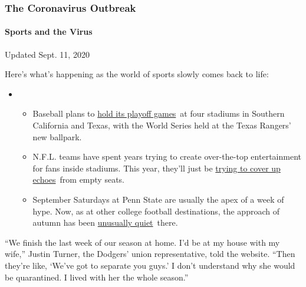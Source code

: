\hypertarget{the-coronavirus-outbreak}{%
\subsubsection{The Coronavirus
Outbreak}\label{the-coronavirus-outbreak}}

\hypertarget{sports-and-the-virus}{%
\paragraph{Sports and the Virus}\label{sports-and-the-virus}}

Updated Sept. 11, 2020

Here's what's happening as the world of sports slowly comes back to
life:

\begin{itemize}
\item
  \begin{itemize}
  \tightlist
  \item
    Baseball plans to
    \href{https://www.nytimes3xbfgragh.onion/2020/09/10/sports/baseball/mlb-postseason-neutral-sites.html?action=click\&pgtype=Article\&state=default\&region=MAIN_CONTENT_2\&context=storylines_keepup}{hold
    its playoff games}~at four stadiums in Southern California and
    Texas, with the World Series held at the Texas Rangers' new
    ballpark.
  \item
    N.F.L. teams have spent years trying to create over-the-top
    entertainment for fans inside stadiums. This year, they'll just be
    \href{https://www.nytimes3xbfgragh.onion/2020/09/10/sports/football/what-will-nfl-games-sound-like.html?action=click\&pgtype=Article\&state=default\&region=MAIN_CONTENT_2\&context=storylines_keepup}{trying
    to cover up echoes}~from empty seats.
  \item
    September Saturdays at Penn State are usually the apex of a week of
    hype. Now, as at other college football destinations, the approach
    of autumn has been
    \href{https://www.nytimes3xbfgragh.onion/2020/09/09/sports/penn-state-college-football-canceled.html?action=click\&pgtype=Article\&state=default\&region=MAIN_CONTENT_2\&context=storylines_keepup}{unusually
    quiet}~there.
  \end{itemize}
\end{itemize}

``We finish the last week of our season at home. I'd be at my house with
my wife,'' Justin Turner, the Dodgers' union representative, told the
website. ``Then they're like, `We've got to separate you guys.' I don't
understand why she would be quarantined. I lived with her the whole
season.''

